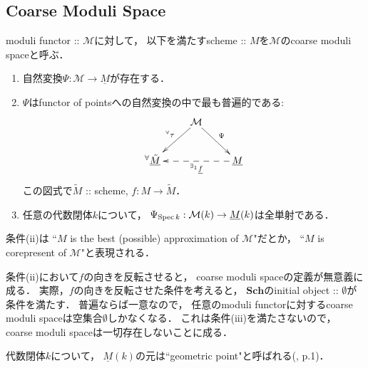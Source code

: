 \documentclass[a4paper]{jsarticle}
\newcommand{\Sch}{\mathbf{Sch}}
\newcommand{\ftor}[1]{\underline{#1}}
\newcommand{\ftorM}{\mathcal{M}}
\begin{document}
    \subsection{Coarse Moduli Space}
    \begin{Def}\label{def:coarse-moduli}
        moduli functor :: $\ftorM$に対して，
        以下を満たすscheme :: $M$を$\ftorM$のcoarse moduli spaceと呼ぶ．
        \begin{enumerate}[label=(\roman*), leftmargin=*]
            \item
                自然変換$\Psi: \ftorM \to \ftor{M}$が存在する．
            \item
                $\Psi$はfunctor of pointsへの自然変換の中で最も普遍的である:
                \[
                \xymatrix
                {
                    {} & \ar[ld]_-{{}^{\forall} \tau}\ftorM \ar[rd]^-{\Psi}& {} \\
                    {}^{\forall}\ftor{\tilde{M}} & {} & \ar@{-->}[ll]^-{{}^{\exists_1} \ftor{f}} \ftor{M}
                }
                \]
                この図式で$\tilde{M}$ :: scheme, $f: M \to \tilde{M}$．
            \item
                任意の代数閉体$k$について，
                $\Psi_{\Spec k}: \ftorM(k) \to \ftor{M}(k)$は全単射である．
        \end{enumerate}
    \end{Def}
    条件(ii)は
    ``$M$ is the best (possible) approximation of $\ftorM$"だとか，
    ``$M$ is corepresent of $\ftorM$"と表現される．

    \begin{Remark}
        条件(ii)において$f$の向きを反転させると，
        coarse moduli spaceの定義が無意義に成る．
        実際，$f$の向きを反転させた条件を考えると，
        $\Sch$のinitial object :: $\emptyset$が条件を満たす．
        普遍ならば一意なので，
        任意のmoduli functorに対するcoarse moduli spaceは空集合$\emptyset$しかなくなる．
        これは条件(iii)を満たさないので，
        coarse moduli spaceは一切存在しないことに成る．
    \end{Remark}

    \begin{Remark}
        代数閉体$k$について，
        $\ftor{M}(k)$の元は``geometric point"と呼ばれる(\cite{GIT}, p.1)．
    \end{Remark}
\end{document}
